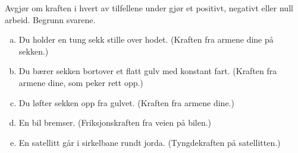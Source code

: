 %
Avgjør om kraften i hvert av tilfellene under gjør et positivt, negativt eller null arbeid. Begrunn svarene.
\begin{enumerate}[a)]
    \item Du holder en tung sekk stille over hodet. (Kraften fra armene dine på sekken.)
    \item Du bærer sekken bortover et flatt gulv med konstant fart. (Kraften fra armene dine, som peker rett opp.)
    \item Du løfter sekken opp fra gulvet. (Kraften fra armene dine.)
    \item En bil bremser. (Friksjonskraften fra veien på bilen.)
    \item En satellitt går i sirkelbane rundt jorda. (Tyngdekraften på satellitten.)
\end{enumerate}
